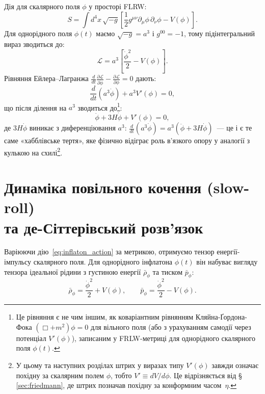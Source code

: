Дія для скалярного поля $\phi$ у просторі FLRW:
\begin{equation}\label{eq:inflaton_action}
  S = \int d^4x\,\sqrt{-g}\left[\frac{1}{2}g^{\mu\nu}\partial_\mu\phi\,\partial_\nu\phi - V(\phi)\right].
\end{equation}
Для однорідного поля $\phi(t)$ маємо $\sqrt{-g} = a^3$ і $g^{00} = -1$,
тому підінтегральний вираз зводиться до:
\begin{equation*}
  \mathcal{L} = a^3\!\left[\frac{\dot{\phi}^2}{2} - V(\phi)\right].
\end{equation*}
Рівняння Ейлера--Лагранжа $\frac{d}{dt}\frac{\partial\mathcal{L}}{\partial\dot{\phi}} - \frac{\partial\mathcal{L}}{\partial\phi} = 0$ дають:
\begin{equation*}
  \frac{d}{dt}\!\left(a^3\dot{\phi}\right) + a^3 V'(\phi) = 0,
\end{equation*}
що після ділення на $a^3$ зводиться до\footnote{Це рівняння є не чим іншим, як коваріантним рівнянням Кляйна-Ґордона-Фока $\left(\Box + m^2\right)\phi = 0$ для вільного поля (або з урахуванням самодії через потенціал $V'(\phi)$), записаним у FRLW-метриці для однорідного скалярного поля $\phi(t)$.}:
\begin{equation}\label{eq:klein_gordon}
    \ddot{\phi} +3H\dot{\phi} + V'(\phi) = 0,
\end{equation}
де $3H\dot{\phi}$ виникає з диференціювання $a^3$:
$\frac{d}{dt}(a^3\dot{\phi}) = a^3(\ddot{\phi} + 3H\dot{\phi})$~---
це і є те саме «хабблівське тертя», яке фізично відіграє роль
в'язкого опору у аналогії з кулькою на схилі\footnote{У цьому та наступних розділах
штрих у виразах типу $V'(\phi)$ завжди означає похідну за
скалярним полем $\phi$, тобто $V' \equiv dV/d\phi$. Це відрізняється
від §\,\ref{sec:friedmann}, де штрих позначав похідну за конформним
часом~$\eta$.}.

\section{Динаміка повільного кочення (slow-roll)\\ та де-Сіт\-те\-рів\-ський розв'язок}
\label{subsec:slowroll_dynamics}

Варіюючи дію~\eqref{eq:inflaton_action} за метрикою, отримуємо тензор енергії-імпульсу скалярного поля. Для однорідного інфлатона $\phi(t)$ він набуває вигляду тензора ідеальної рідини з густиною енергії $\bar{\rho}_\phi$ та тиском $\bar{p}_\phi$:
\begin{equation}\label{eq:inflaton_rho_p}
  \bar{\rho}_\phi = \frac{\dot{\phi}^2}{2} + V(\phi),
  \qquad
  \bar{p}_\phi   = \frac{\dot{\phi}^2}{2} - V(\phi).
\end{equation}

